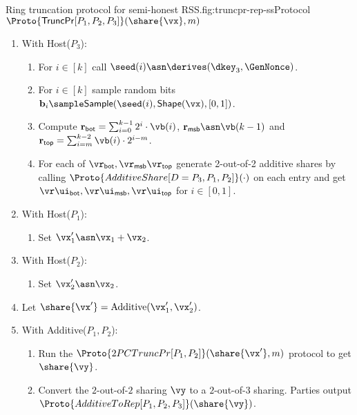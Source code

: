 \begin{Boxfig}{Ring truncation protocol for semi-honest
RSS.}{fig:truncpr-rep-ss}{Protocol $\Proto{\mathsf{TruncPr}{[P_1, P_2, P_3]}}(\share{\vx}, m)$}
\begin{enumerate}
  \item With Host($P_3$):
  \begin{enumerate}
    \item For $i \in [k]$ call $\seed(i) \asn \derives(\dkey_3, \GenNonce)$.
    \item For $i \in [k]$ sample random bits $\mathbf{b}_i \sample \mathsf{Sample}(\seed(i), \mathsf{Shape}(\vx), [0,1])$.
    \item Compute
    $\mathbf{r}_{\mathsf{bot}} = \sum_{i=0}^{k-1}2^i \cdot \vb(i)$,
    $\mathbf{r}_{\mathsf{msb}} \asn \vb(k-1)$ and
    $\mathbf{r}_{\mathsf{top}} = \sum_{i=m}^{k-2} \vb(i) \cdot 2^{i-m}$.
    \item For each of $\vr_{\mathsf{bot}}, \vr_{\mathsf{msb}} \vr_{\mathsf{top}}$
    generate 2-out-of-2 additive shares by calling $\Proto{AdditiveShare[D=P_3, P_1, P_2]}(\cdot)$
    on each entry and get $
    \vr\ui_{\mathsf{bot}}, \vr\ui_{\mathsf{msb}}, \vr\ui_{\mathsf{top}}$ for $i \in [0,1]$.
 \end{enumerate}
\item With Host($P_1$):
\begin{enumerate}
  \item Set $\vx'_1 \asn \vx_1 + \vx_2$.
\end{enumerate}

\item With Host($P_2$):
\begin{enumerate}
    \item Set $\vx'_2 \asn \vx_2$.
\end{enumerate}
\item Let $\share{\vx'} = \text{Additive}(\vx'_1, \vx'_2)$.

\item With Additive($P_1, P_2$):
\begin{enumerate}
   \item Run the $\Proto{2PCTruncPr[P_1, P_2]}(\share{\vx'}, m)$ protocol to get $\share{\vy}$.
  \item Convert the $2$-out-of-$2$ sharing $\vy$ to a $2$-out-of-$3$
 sharing. Parties output $\Proto{AdditiveToRep[P_1, P_2, P_3]}(\share{\vy})$.
\end{enumerate}
\end{enumerate}

\end{Boxfig}

